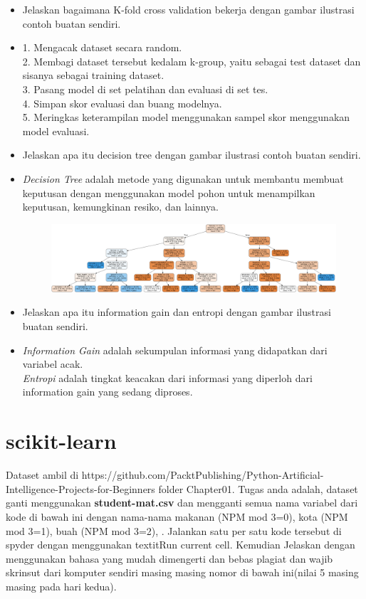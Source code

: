 \begin{enumerate}
\begin{itemize}
\begin{figure}[!htbp]
	\end{figure}
	\item
	Jelaskan bagaimana K-fold cross validation bekerja dengan gambar ilustrasi contoh buatan sendiri.\\
	\item 
	1. Mengacak dataset secara random.\\
	2. Membagi dataset tersebut kedalam k-group, yaitu sebagai test dataset dan sisanya sebagai training dataset.\\
	3. Pasang model di set pelatihan dan evaluasi di set tes.\\
	4. Simpan skor evaluasi dan buang modelnya.\\
	5. Meringkas keterampilan model menggunakan sampel skor menggunakan model evaluasi.
	\item
	Jelaskan apa itu decision tree dengan gambar ilustrasi contoh buatan sendiri.
	\item 
	\textit{Decision Tree} adalah metode yang digunakan untuk membantu membuat keputusan dengan menggunakan model pohon untuk menampilkan keputusan, kemungkinan resiko, dan lainnya.
	\begin{figure}[!htbp]
		\centering
		\includegraphics[scale=0.1]{figures/student-performance.PNG}
	\end{figure}
	\item
	Jelaskan apa itu information gain dan entropi dengan gambar ilustrasi buatan sendiri.
	\item 
	\textit{Information Gain} adalah sekumpulan informasi yang didapatkan dari variabel acak.\\
	\textit{Entropi} adalah tingkat keacakan dari informasi yang diperloh dari information gain yang sedang diproses.
\end{itemize}
\end{enumerate}

\section{scikit-learn}
Dataset ambil di https://github.com/PacktPublishing/Python-Artificial-Intelligence-Projects-for-Beginners folder Chapter01.
Tugas anda adalah, dataset ganti menggunakan \textbf{student-mat.csv} dan mengganti semua nama variabel dari kode di bawah ini dengan nama-nama makanan (NPM mod 3=0), kota (NPM mod 3=1), buah (NPM mod 3=2), . Jalankan satu per satu kode tersebut di spyder dengan menggunakan textit{Run current cell}. Kemudian Jelaskan dengan menggunakan bahasa yang mudah dimengerti dan bebas plagiat dan wajib skrinsut dari komputer sendiri masing masing nomor di bawah ini(nilai 5 masing masing pada hari kedua).

